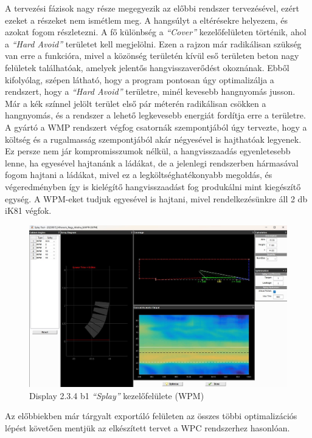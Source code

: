 A tervezési fázisok nagy része megegyezik az előbbi rendszer tervezésével, ezért ezeket a részeket nem ismétlem meg.
A hangsúlyt a eltérésekre helyezem, és azokat fogom részletezni.
A fő különbség a \textit{``Cover''} kezelőfelületen történik, ahol a \textit{``Hard Avoid''} területet kell megjelölni.
Ezen a rajzon már radikálisan szükség van erre a funkcióra, mivel a közönség területén kívül eső területen beton nagy felületek találhatóak,
amelyek jelentős hangvisszaverődést okoznának. 
Ebből kifolyólag, szépen látható, hogy a program pontosan úgy optimalizálja a rendszert, hogy a \textit{``Hard Avoid''} területre, minél kevesebb
hangnyomás jusson.
Már a kék színnel jelölt terület első pár méterén radikálisan csökken a hangnyomás, és a rendszer a lehető legkevesebb energiát fordítja erre a területre.
A gyártó a WMP rendszert végfog csatornák szempontjából úgy tervezte, hogy a költség és a rugalmasság szempontjából akár négyesével is hajthatóak legyenek.
Ez persze nem jár kompromisszumok nélkül, a hangvisszaadás egyenletesebb lenne, ha egyesével hajtanánk a ládákat, de a jelenlegi rendszerben
hármasával fogom hajtani a ládákat, mivel ez a legköltséghatékonyabb megoldás, és végeredményben így is kielégítő hangvisszaadást fog produkálni mint 
kiegészítő egység. A WPM-eket tudjuk egyesével is hajtani, mivel rendelkezésünkre áll 2 db iK81 végfok.
\begin{figure}[H]
	\centering
	\includegraphics[width=\textwidth, keepaspectratio]{figures/display_wpm_2.jpg}
	\caption{Display 2.3.4 b1 \textit{``Splay''} kezelőfelülete (WPM)}\label{fig:display_wpm_2}
\end{figure}
Az előbbiekben már tárgyalt exportáló felületen az összes többi optimalizációs lépést követően
mentjük az elkészített tervet a WPC rendszerhez hasonlóan.
